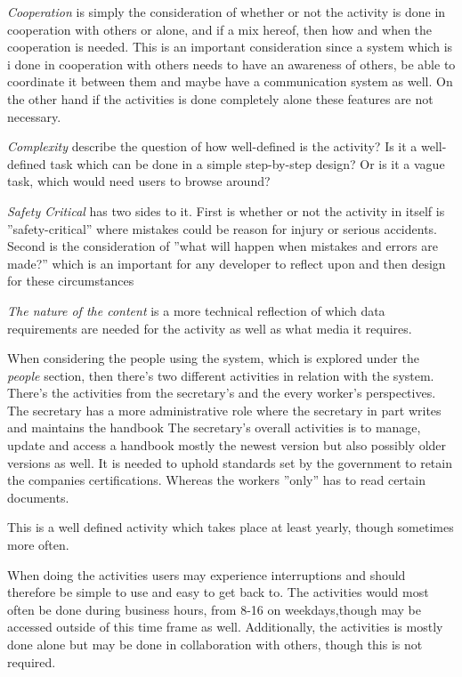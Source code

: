 \textit{Cooperation} is simply the consideration of whether or not the activity is done in cooperation with others or alone, and if a mix hereof, then how and when the cooperation is needed.
This is an important consideration since a system which is i done in cooperation with others needs to have an awareness of others, be able to coordinate it between them and maybe have a communication system as well.
On the other hand if the activities is done completely alone these features are not necessary. 

\textit{Complexity} describe the question of how well-defined is the activity?
Is it a well-defined task which can be done in a simple step-by-step design?
Or is it a vague task, which would need users to browse around?

\textit{Safety Critical} has two sides to it.
First is whether or not the activity in itself is ''safety-critical'' where mistakes could be reason for injury or serious accidents.
Second is the consideration of ''what will happen when mistakes and errors are made?'' which is an important for any developer to reflect upon and then design for these circumstances

\textit{The nature of the content} is a more technical reflection of which data requirements are needed for the activity as well as what media it requires.

When considering the people using the system, which is explored under the \textit{people} section, then there's two different activities in relation with the system.
There's the activities from the secretary's and the every worker's perspectives.
The secretary has a more administrative role where the secretary in part writes and maintains the handbook
The secretary's overall activities is to manage, update and access a handbook mostly the newest version but also possibly older versions as well. 
It is needed to uphold standards set by the government to retain the companies certifications.
Whereas the workers ''only'' has to read certain documents.

This is a well defined activity which takes place at least yearly, though sometimes more often.

When doing the activities users may experience interruptions and should therefore be simple to use and easy to get back to.
The activities would most often be done during business hours, from 8-16 on weekdays,though may be accessed outside of this time frame as well.
Additionally, the activities is mostly done alone but may be done in collaboration with others, though this is not required.

